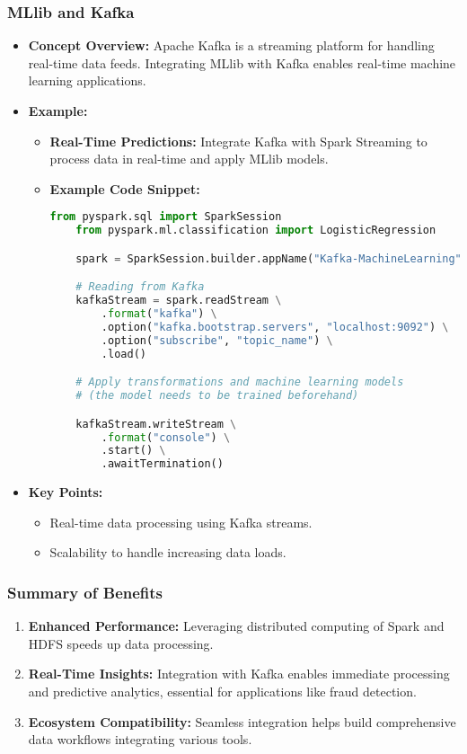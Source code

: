 \documentclass[aspectratio=169]{beamer}
\begin{document}
\begin{frame}[fragile]
    \frametitle{MLlib and Kafka}
    \begin{itemize}
        \item \textbf{Concept Overview:} 
        Apache Kafka is a streaming platform for handling real-time data feeds. Integrating MLlib with Kafka enables real-time machine learning applications.
        
        \item \textbf{Example:}
        \begin{itemize}
            \item \textbf{Real-Time Predictions:} Integrate Kafka with Spark Streaming to process data in real-time and apply MLlib models.
            \item \textbf{Example Code Snippet:}
            \begin{lstlisting}[language=Python]
    from pyspark.sql import SparkSession
    from pyspark.ml.classification import LogisticRegression

    spark = SparkSession.builder.appName("Kafka-MachineLearning").getOrCreate()

    # Reading from Kafka
    kafkaStream = spark.readStream \
        .format("kafka") \
        .option("kafka.bootstrap.servers", "localhost:9092") \
        .option("subscribe", "topic_name") \
        .load()

    # Apply transformations and machine learning models
    # (the model needs to be trained beforehand)

    kafkaStream.writeStream \
        .format("console") \
        .start() \
        .awaitTermination()
            \end{lstlisting}
        \end{itemize}
        
        \item \textbf{Key Points:}
        \begin{itemize}
            \item Real-time data processing using Kafka streams.
            \item Scalability to handle increasing data loads.
        \end{itemize}
    \end{itemize}
\end{frame}

\begin{frame}[fragile]
    \frametitle{Summary of Benefits}
    \begin{enumerate}
        \item \textbf{Enhanced Performance:} Leveraging distributed computing of Spark and HDFS speeds up data processing.
        \item \textbf{Real-Time Insights:} Integration with Kafka enables immediate processing and predictive analytics, essential for applications like fraud detection.
        \item \textbf{Ecosystem Compatibility:} Seamless integration helps build comprehensive data workflows integrating various tools.
    \end{enumerate}
\end{frame}
\end{document}
